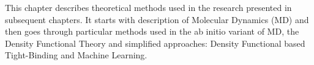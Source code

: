 \label{chapter:theoretical-methods}

This chapter describes theoretical methods used in the research presented in subsequent chapters. It starts with description of Molecular Dynamics (MD) and then goes through particular methods used in the ab initio variant of MD, the Density Functional Theory and simplified approaches: Density Functional based Tight-Binding and Machine Learning.